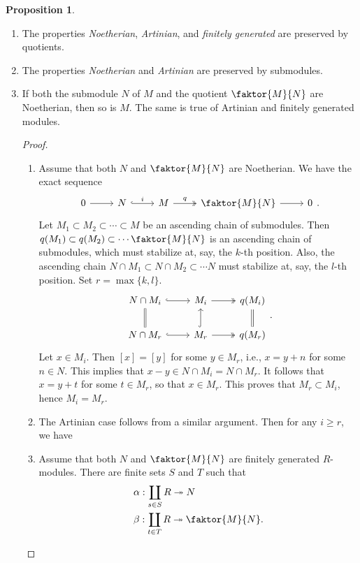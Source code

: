 \documentclass[10pt,letterpaper,cm]{nupset}
\theoremstyle{definition}
\newtheorem{prop}{Proposition}
\newcommand{\1}{\mathbf{1}}
\newcommand{\0}{\vec 0}
\begin{document}
\begin{prop} $ $
\begin{enumerate}
\item The properties \textit{Noetherian}, \textit{Artinian}, and \textit{finitely generated} are preserved by quotients. 
\item The properties \textit{Noetherian} and \textit{Artinian} are preserved by submodules.
\item If both the submodule $N$ of $M$ and the quotient $\faktor{M}{N}$ are Noetherian, then so is $M$. The same is true of Artinian and finitely generated modules.
\begin{proof} $ $
\begin{enumerate} 
\item Assume that both $N$ and $\faktor{M}{N}$ are Noetherian. We have the exact sequence
\[
\begin{tikzcd}
0 \arrow[r] & N \arrow[r, "i", hook] & M \arrow[r, "q", two heads] & \faktor{M}{N} \arrow[r] & 0
\end{tikzcd}.
\] Let $M_1 \subset M_2 \subset \cdots \subset M$ be an ascending chain of submodules.  Then $q(M_1) \subset q(M_2) \subset \cdots \faktor{M}{N}$ is an ascending chain of submodules, which must stabilize at, say, the $k$-th position. Also, the ascending chain $N \cap M_1 \subset N \cap M_2 \subset \cdots N$ must stabilize at, say, the $l$-th position. Set $ r= \max\{k, l\}$.
\[
\begin{tikzcd}
N \cap M_i \arrow[r, hook] & M_i \arrow[r, two heads] & q(M_i) \\
N \cap M_r \arrow[u, equal] \arrow[r, hook] & M_r \arrow[u, hook] \arrow[r, two heads] & q(M_r) \arrow[u, equal]
\end{tikzcd}.
\]
Let $x \in M_i$. Then $[x] = [y]$ for some $y\in M_r$, i.e., $x = y+n$ for some $n\in N$. This implies that $x-y \in N \cap M_i = N \cap M_r$. It follows that $x = y+t$ for some $t\in M_r$, so that $x\in M_r$. This proves that $M_r\subset M_i$, hence $M_i = M_r$.
\item The Artinian case follows from a similar argument. Then for any $i\geq r$, we have
\item Assume that both $N$ and $\faktor{M}{N}$ are finitely generated $R$-modules. There are finite sets $S$ and $T$ such that
\begin{align*}
& \alpha: \coprod_{s\in S}R \twoheadrightarrow N  \\
& \beta : \coprod_{t\in T} R \twoheadrightarrow \faktor{M}{N}.
\end{align*}

\end{enumerate}
\end{proof}
\end{enumerate}
\end{prop}
\end{document}
